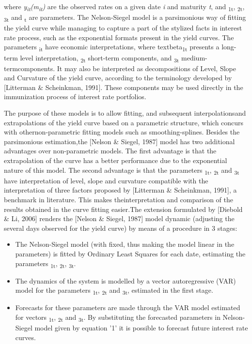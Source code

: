 \documentclass{article}
\begin{document}
where \textit{y\textsubscript{it}(m\textsubscript{it})} are the observed rates on a given date \textit{i} and maturity \textit{t}, and \textbeta\textsubscript{1t}, \textbeta\textsubscript{2t}, \textbeta\textsubscript{3t} 
and \texttau\textsubscript{t} are parameters. The Nelson-Siegel model is a parsimonious way of fitting the yield curve while managing to capture a part of the stylized facts in interest rate process, such as the exponential formats present in the yield curves.  The parameters \textbeta\textsubscript{it} have economic interpretations, where textbeta\textsubscript{1t} presents a long-term level interpretation, \textbeta\textsubscript{2t} short-term components, and \textbeta\textsubscript{3t} medium-termcomponents. It may also be interpreted as decompositions of Level, Slope and Curvature of the yield curve, according to the terminology developed by [Litterman \& Scheinkman, 1991]. These components may be used directly in the immunization process of interest rate portfolios. 

The purpose of these models is to allow fitting, and subsequent interpolationsand extrapolations of the yield curve based on a parametric structure, which concurs with othernon-parametric fitting models such as smoothing-splines. Besides the parsimonious estimation,the [Nelson \& Siegel, 1987] model 
has two additional advantages over non-parametric models. The first advantage is that the extrapolation of the curve has a better performance due to the exponential nature of this model.  The second advantage is that the parameters \textbeta\textsubscript{1t}, \textbeta\textsubscript{2t} and \textbeta\textsubscript{3t} have interpretation of level, slope and curvature compatible with the interpretation of three factors proposed by [Litterman \& Scheinkman, 1991], a benchmark in literature. This makes theinterpretation and comparison of the results obtained in the curve fitting easier.The extension formulated by [Diebold \& Li, 2006] renders the [Nelson \& Siegel, 1987] model dynamic (adjusting the several days observed for the yield curve) by means of a procedure in 3 stages:

\begin{itemize}
\item The Nelson-Siegel model (with \texttau fixed, thus making the model linear in the parameters) is fitted by Ordinary Least Squares for each date, estimating the parameters \textbeta\textsubscript{1t}, \textbeta\textsubscript{2t}, \textbeta\textsubscript{3t}.
\item The dynamics of the system is modelled by a vector autoregressive (VAR) model for the parameters \textbeta\textsubscript{1t}, \textbeta\textsubscript{2t} and \textbeta\textsubscript{3t}, estimated in the first stage. 
\item Forecasts for these parameters are made through the VAR model estimated for vectors \textbeta\textsubscript{1t}, \textbeta\textsubscript{2t} and \textbeta\textsubscript{3t}. By substituting the forecasted parameters in Nelson-Siegel model given by equation '1' it is possible to forecast future interest rate curves. %
\end{itemize}
\end{document}
